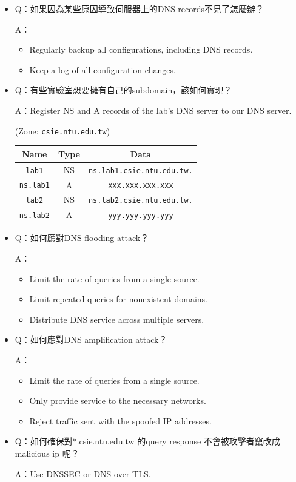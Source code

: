 \documentclass[12pt, a4paper]{article}
\begin{document}
\begin{itemize}
    \item Q：如果因為某些原因導致伺服器上的DNS records不見了怎麼辦？

    A：
    \begin{itemize}
      \item Regularly backup all configurations, including DNS records.
      \item Keep a log of all configuration changes.
    \end{itemize}

    \item Q：有些實驗室想要擁有自己的subdomain，該如何實現？

    A：Register NS and A records of the lab's DNS server to our DNS server.

    (Zone: \verb|csie.ntu.edu.tw|)

    \begin{tabular}{|c|c|c|}
      \hline
      \textbf{Name} & \textbf{Type} & \textbf{Data} \\\hline
      \verb|lab1| & NS & \verb|ns.lab1.csie.ntu.edu.tw.| \\
      \verb|ns.lab1| & A & \verb|xxx.xxx.xxx.xxx| \\
      \verb|lab2| & NS & \verb|ns.lab2.csie.ntu.edu.tw.| \\
      \verb|ns.lab2| & A & \verb|yyy.yyy.yyy.yyy| \\\hline
    \end{tabular}

    \pagebreak
    \item Q：如何應對DNS flooding attack？

    A：
    \begin{itemize}
      \item Limit the rate of queries from a single source.
      \item Limit repeated queries for nonexistent domains.
      \item Distribute DNS service across multiple servers.
    \end{itemize}

    \item Q：如何應對DNS amplification attack？

    A：
    \begin{itemize}
      \item Limit the rate of queries from a single source.
      \item Only provide service to the necessary networks.
      \item Reject traffic sent with the spoofed IP addresses.
    \end{itemize}

    \item Q：如何確保對*.csie.ntu.edu.tw 的query response 不會被攻擊者竄改成malicious ip 呢？

    A：Use DNSSEC or DNS over TLS.
  \end{itemize}
\end{document}
